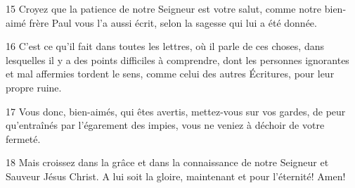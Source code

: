\par 15 Croyez que la patience de notre Seigneur est votre salut, comme notre bien-aimé frère Paul vous l'a aussi écrit, selon la sagesse qui lui a été donnée.
\par 16 C'est ce qu'il fait dans toutes les lettres, où il parle de ces choses, dans lesquelles il y a des points difficiles à comprendre, dont les personnes ignorantes et mal affermies tordent le sens, comme celui des autres Écritures, pour leur propre ruine.
\par 17 Vous donc, bien-aimés, qui êtes avertis, mettez-vous sur vos gardes, de peur qu'entraînés par l'égarement des impies, vous ne veniez à déchoir de votre fermeté.
\par 18 Mais croissez dans la grâce et dans la connaissance de notre Seigneur et Sauveur Jésus Christ. A lui soit la gloire, maintenant et pour l'éternité! Amen!


